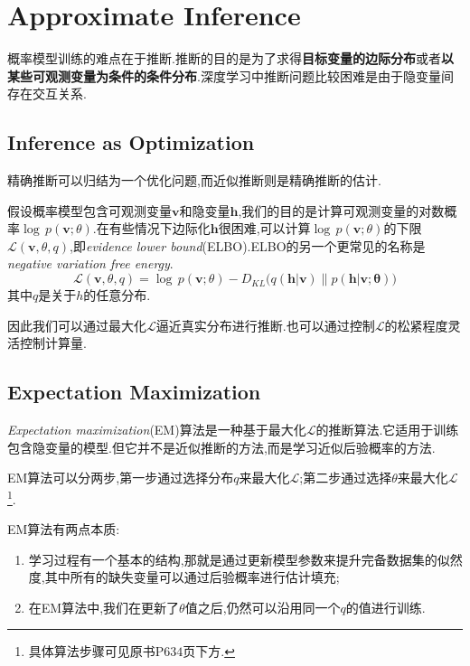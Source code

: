 \chapter{Approximate Inference}

概率模型训练的难点在于推断.推断的目的是为了求得\textbf{目标变量的边际分布}或者\textbf{以某些可观测变量为条件的条件分布}.深度学习中推断问题比较困难是由于隐变量间存在交互关系.

\section{Inference as Optimization}

精确推断可以归结为一个优化问题,而近似推断则是精确推断的估计.

假设概率模型包含可观测变量$\mathbf v$和隐变量$\mathbf h$,我们的目的是计算可观测变量的对数概率$\log\,p(\mathbf v;\theta)$.在有些情况下边际化$\mathbf h$很困难,可以计算$\log\,p(\mathbf v;\theta)$的下限$\mathcal L(\mathbf v,\theta,q)$,即\textit{evidence lower bound}(ELBO).ELBO的另一个更常见的名称是\textit{negative variation free energy}.
\begin{equation}
\mathcal L(\mathbf v,\theta,q)=\log\,p(\mathbf v;\theta)-D_{KL}\Big(q(\mathbf{h|v})\big\|p(\mathbf{h|v;\theta})\Big)
\end{equation}
其中$q$是关于$h$的任意分布.

因此我们可以通过最大化$\mathcal L$逼近真实分布进行推断.也可以通过控制$\mathcal L$的松紧程度灵活控制计算量.

\section{Expectation Maximization}

\textit{Expectation maximization}(EM)算法是一种基于最大化$\mathcal L$的推断算法.它适用于训练包含隐变量的模型.但它并不是近似推断的方法,而是学习近似后验概率的方法.

EM算法可以分两步,第一步通过选择分布$q$来最大化$\mathcal L$;第二步通过选择$\theta$来最大化$\mathcal L$\footnote{具体算法步骤可见原书P$634$页下方.}.

EM算法有两点本质:
\begin{enumerate}
    \item 学习过程有一个基本的结构,那就是通过更新模型参数来提升完备数据集的似然度,其中所有的缺失变量可以通过后验概率进行估计填充;
    \item 在EM算法中,我们在更新了$\theta$值之后,仍然可以沿用同一个$q$的值进行训练.
\end{enumerate}

